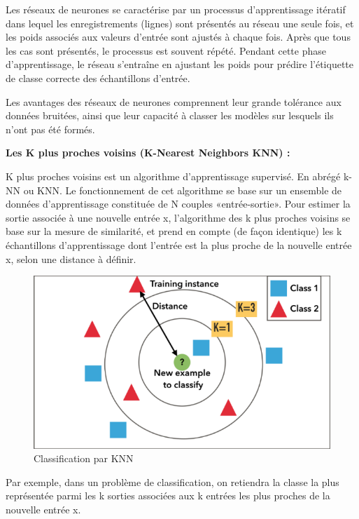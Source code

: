 Les réseaux de neurones se caractérise par un processus d'apprentissage itératif dans lequel les enregistrements (lignes) sont présentés au réseau une seule fois, et les poids associés aux valeurs d'entrée sont ajustés à chaque fois. Après que tous les cas sont présentés, le processus est souvent répété. Pendant cette phase d'apprentissage, le réseau s'entraîne en ajustant les poids pour prédire l'étiquette de classe correcte des échantillons d'entrée.

Les avantages des réseaux de neurones comprennent leur grande tolérance aux données bruitées, ainsi que leur capacité à classer les modèles sur lesquels ils n'ont pas été formés.


\textbf{Les K plus proches voisins (K-Nearest Neighbors KNN) :}

K plus proches voisins est un algorithme d’apprentissage supervisé. En abrégé k-NN ou KNN.
Le fonctionnement de cet algorithme se base sur un ensemble de données d'apprentissage constituée de N couples «entrée-sortie». Pour estimer la sortie associée à une nouvelle entrée x, l'algorithme des k plus proches voisins se base sur la mesure de similarité, et prend en compte (de façon identique) les k échantillons d'apprentissage dont l’entrée est la plus proche de la nouvelle entrée x, selon une distance à définir.


\begin{figure}[H]
\begin{center}
\includegraphics[width=1\linewidth]{images/KNN.png}
\end{center}
\caption{Classification par KNN}
\label{fig:10}
\end{figure}


Par exemple, dans un problème de classification, on retiendra la classe la plus représentée parmi les k sorties associées aux k entrées les plus proches de la nouvelle entrée x.

